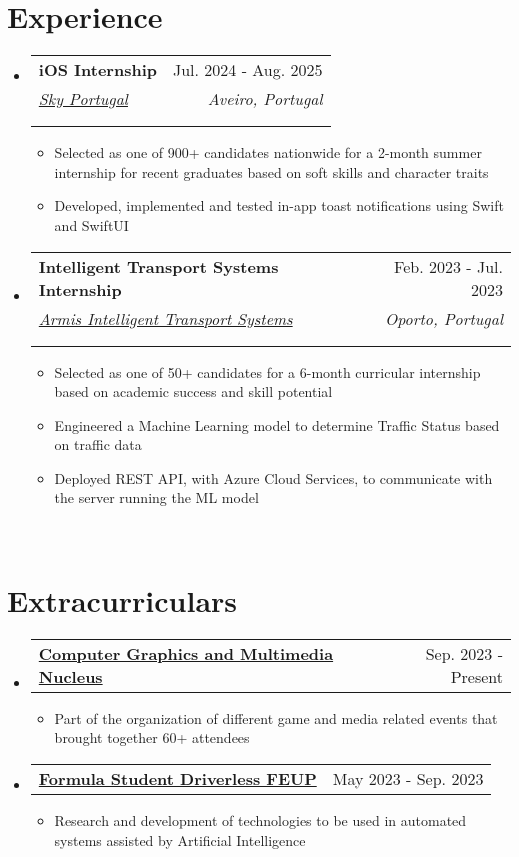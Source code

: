 \documentclass[letterpaper,11pt]{article}
\makeatletter
\newcommand{\resumeItem}[1]{
  \item\small{
    {#1 \vspace{-2pt}}
  }
}
\newcommand{\resumeSubheading}[5]{
  \vspace{-2pt}\item
    \begin{tabular*}{0.97\textwidth}[t]{l@{\extracolsep{\fill}}r}
      \textbf{#1} & #2 \\
      \textit{\small#3} & \textit{\small #4} \\
      \if\relax\detokenize{#5}\relax
      \else
        \multicolumn{2}{@{}l}{\textit{\small#5}} \\
      \fi
    \end{tabular*}\vspace{-7pt}
}
\newcommand{\resumeSubSubheading}[2]{
    \item
    \begin{tabular*}{0.97\textwidth}{l@{\extracolsep{\fill}}r}
      \textit{\small#1} & \textit{\small #2} \\
    \end{tabular*}\vspace{-7pt}
}
\newcommand{\resumeProjectHeading}[2]{
    \item
    \begin{tabular*}{0.97\textwidth}{l@{\extracolsep{\fill}}r}
      \small#1 & #2 \\
    \end{tabular*}\vspace{-7pt}
}
\newcommand{\resumeSubHeadingListStart}{\begin{itemize}[leftmargin=0.15in, label={}]}
\newcommand{\resumeSubHeadingListEnd}{\end{itemize}}
\newcommand{\resumeItemListStart}{\begin{itemize}}
\newcommand{\resumeItemListEnd}{\end{itemize}\vspace{-5pt}}
\makeatother
\begin{document}

\section{Experience}
  \resumeSubHeadingListStart

    \resumeSubheading
        {iOS Internship}{Jul. 2024 - Aug. 2025}
        {\href{https://www.sky.com/}{Sky Portugal}}{Aveiro, Portugal}
        {}
        \resumeItemListStart
            \resumeItem{Selected as one of 900+ candidates nationwide for a 2-month summer internship for recent graduates based on soft skills and character traits}
            \resumeItem{Developed, implemented and tested in-app toast notifications using Swift and SwiftUI}
        \resumeItemListEnd

    \resumeSubheading
      {Intelligent Transport Systems Internship}{Feb. 2023 - Jul. 2023}
      {\href{https://www.armisgroup.com/intelligent-transport-systems/}{Armis Intelligent Transport Systems}}{Oporto, Portugal}
      {}
      \resumeItemListStart
        \resumeItem{Selected as one of 50+ candidates for a 6-month curricular internship based on academic success and skill potential}
        \resumeItem{Engineered a Machine Learning model to determine Traffic Status based on traffic data}
        \resumeItem{Deployed REST API, with Azure Cloud Services, to communicate with the server running the ML model}
      \resumeItemListEnd
  \resumeSubHeadingListEnd
\leavevmode \\ %

\section{Extracurriculars}
    \resumeSubHeadingListStart
      \resumeProjectHeading
                {\textbf{\href{https://ncgm.fe.up.pt/en/home}{Computer Graphics and Multimedia Nucleus}}}{Sep. 2023 - Present}
          \resumeItemListStart
            \resumeItem{Part of the organization of different game and media related events that brought together 60+ attendees}
          \resumeItemListEnd
      \resumeProjectHeading
          {\textbf{\href{https://formulastudent.fe.up.pt/en/}{Formula Student Driverless FEUP}}}{May 2023 - Sep. 2023}
          \resumeItemListStart
            \resumeItem{Research and development of technologies to be used in automated systems assisted by Artificial Intelligence}
          \resumeItemListEnd
    \resumeSubHeadingListEnd
\leavevmode \\ %
\end{document}
